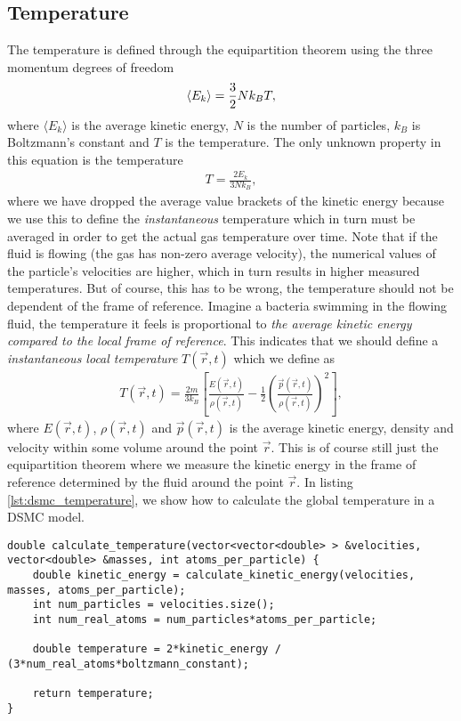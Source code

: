 \subsection{Temperature}
The temperature is defined through the equipartition theorem using the three momentum degrees of freedom
\begin{align}
	\langle E_k \rangle = {3\over 2}Nk_BT,
\end{align}
where $\langle E_k \rangle$ is the average kinetic energy, $N$ is the number of particles, $k_B$ is Boltzmann's constant and $T$ is the temperature. The only unknown property in this equation is the temperature
\begin{align}
	\label{eq:dsmc_temperature}
	T = \frac{2E_k}{3Nk_B},
\end{align}
where we have dropped the average value brackets of the kinetic energy because we use this to define the \textit{instantaneous} temperature which in turn must be averaged in order to get the actual gas temperature over time. Note that if the fluid is flowing (the gas has non-zero average velocity), the numerical values of the particle's velocities are higher, which in turn results in higher measured temperatures. But of course, this has to be wrong, the temperature should not be dependent of the frame of reference. Imagine a bacteria swimming in the flowing fluid, the temperature it feels is proportional to \textit{the average kinetic energy compared to the local frame of reference}. This indicates that we should define a \textit{instantaneous local temperature} $T(\vec r, t)$ which we define as
\begin{align}
	\label{eq:dsmc_local_temperature}
	T(\vec r, t) = \frac{2m}{3k_B}\left[\frac{E(\vec r, t)}{\rho(\vec r, t)} - \frac{1}{2}\left(\frac{\vec p(\vec r, t)}{\rho(\vec r, t)}\right)^2\right],
\end{align}
where $E(\vec r,t)$, $\rho(\vec r,t)$ and $\vec p(\vec r,t)$ is the average kinetic energy, density and velocity within some volume around the point $\vec r$. This is of course still just the equipartition theorem where we measure the kinetic energy in the frame of reference determined by the fluid around the point $\vec r$. In listing \ref{lst:dsmc_temperature}, we show how to calculate the global temperature in a DSMC model. 
\begin{lstlisting}[caption=Calculation of instantaneous temperature., label=lst:dsmc_temperature]
double calculate_temperature(vector<vector<double> > &velocities, vector<double> &masses, int atoms_per_particle) {
	double kinetic_energy = calculate_kinetic_energy(velocities, masses, atoms_per_particle);
	int num_particles = velocities.size();
	int num_real_atoms = num_particles*atoms_per_particle;
	
	double temperature = 2*kinetic_energy / (3*num_real_atoms*boltzmann_constant);
	
	return temperature;
}
\end{lstlisting}

